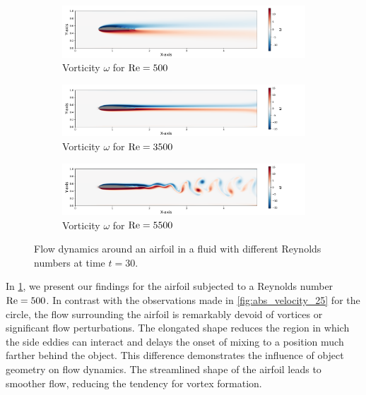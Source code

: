 \begin{figure}[!htb]
    \centering
    \hspace*{0.7cm}
    \begin{subfigure}[b]{\linewidth} %
        \includegraphics[width=\linewidth]{0_graphics/numeric/RE500_30_airfoil.pdf}
        \caption{Vorticity $\omega$ for $\mathrm{Re} = 500$}
        \label{fig:RE500_airfoil}
    \end{subfigure}

    \hspace*{0.7cm}
    \begin{subfigure}[b]{\linewidth} %
        \includegraphics[width=\linewidth]{0_graphics/numeric/RE3500_30_airfoil.pdf}
        \caption{Vorticity $\omega$ for $\mathrm{Re} = 3500$}
        \label{fig:RE3500_airfoil}
    \end{subfigure}

    \hspace*{0.7cm}
    \begin{subfigure}[b]{\linewidth} %
        \includegraphics[width=\linewidth]{0_graphics/numeric/RE5500_30_airfoil.pdf}
        \caption{Vorticity $\omega$ for $\mathrm{Re} = 5500$}
        \label{fig:RE5500_airfoil}
    \end{subfigure}

    \caption{Flow dynamics around an airfoil in a fluid with different Reynolds numbers at time $t=30$.}
    \label{fig:airfoil}
\end{figure}

In \cref{fig:RE500_airfoil}, we present our findings for the airfoil subjected to a Reynolds number $\mathrm{Re} = 500$. In contrast with the observations made in \cref{fig:abs_velocity_25} for the circle, the flow surrounding the airfoil is remarkably devoid of vortices or significant flow perturbations. The elongated shape reduces the region in which the side eddies can interact and delays the onset of mixing to a position much farther behind the object. This difference demonstrates the influence of object geometry on flow dynamics. The streamlined shape of the airfoil leads to smoother flow, reducing the tendency for vortex formation.

